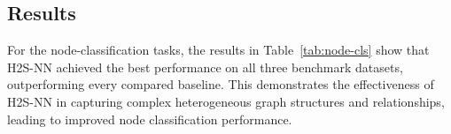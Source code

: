 \documentclass[sigconf,anonymous,review]{acmart}
\newcommand{\method}{\textsc{H2S-NN}}
\begin{document}
\subsection{Results}
\label{sec:results}

For the node-classification tasks, the results in Table~\ref{tab:node-cls} show that \method{} achieved the best performance on all three benchmark datasets, outperforming every compared baseline. This demonstrates the effectiveness of \method{} in capturing complex heterogeneous graph structures and relationships, leading to improved node classification performance.

\begin{table}[htbp]
  \centering
  \caption{Performance on node classification benchmarks measured by Macro-F1 and Micro-F1. Best values are bold. The numbers in parentheses of datasets indicate the homophily ratio.}
  \label{tab:node-cls}
  \scriptsize
\end{table}
\end{document}
